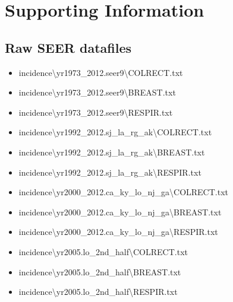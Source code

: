 \documentclass[10pt,letterpaper]{article}
\begin{document}

\section*{Supporting Information}
\label{sec:supporting}

\subsection*{Raw SEER datafiles}
\label{sec:raw}

\begin{itemize}[noitemsep]
\item incidence\textbackslash yr1973\_2012.seer9\textbackslash COLRECT.txt
\item incidence\textbackslash yr1973\_2012.seer9\textbackslash BREAST.txt
\item incidence\textbackslash yr1973\_2012.seer9\textbackslash RESPIR.txt
\item incidence\textbackslash yr1992\_2012.sj\_la\_rg\_ak\textbackslash COLRECT.txt
\item incidence\textbackslash yr1992\_2012.sj\_la\_rg\_ak\textbackslash BREAST.txt
\item incidence\textbackslash yr1992\_2012.sj\_la\_rg\_ak\textbackslash RESPIR.txt
\item incidence\textbackslash yr2000\_2012.ca\_ky\_lo\_nj\_ga\textbackslash COLRECT.txt
\item incidence\textbackslash yr2000\_2012.ca\_ky\_lo\_nj\_ga\textbackslash BREAST.txt
\item incidence\textbackslash yr2000\_2012.ca\_ky\_lo\_nj\_ga\textbackslash RESPIR.txt
\item incidence\textbackslash yr2005.lo\_2nd\_half\textbackslash COLRECT.txt
\item incidence\textbackslash yr2005.lo\_2nd\_half\textbackslash BREAST.txt
\item incidence\textbackslash yr2005.lo\_2nd\_half\textbackslash RESPIR.txt
\end{itemize}
\end{document}
